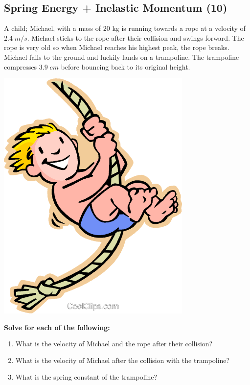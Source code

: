 \documentclass{article}
\begin{document}
\subsection{Spring Energy + Inelastic Momentum (10)}

\vspace{5pt}

\begin{minipage}{0.6\textwidth}
    A child; Michael, with a mass of $20$ kg is running towards a rope at a velocity of $2.4\;m/s$. Michael sticks to the rope
    after their collision and swings forward. The rope is very old so when Michael reaches his highest peak, the rope breaks.
    Michael falls to the ground and luckily lands on a trampoline. The trampoline compresses $3.9\;cm$ before bouncing back
    to its original height.
\end{minipage}
\hspace{5pt}
\begin{minipage}{0.3\textwidth}
    \includegraphics[scale=0.35]{images/child_rope.png}
\end{minipage}

\vspace{20pt}

\noindent\textbf{Solve for each of the following:}
\begin{enumerate}[label=\alph*)]
    \item What is the velocity of Michael and the rope after their collision?
    \item What is the velocity of Michael after the collision with the trampoline?
    \item What is the spring constant of the trampoline?
\end{enumerate}\leavevmode
\end{document}
